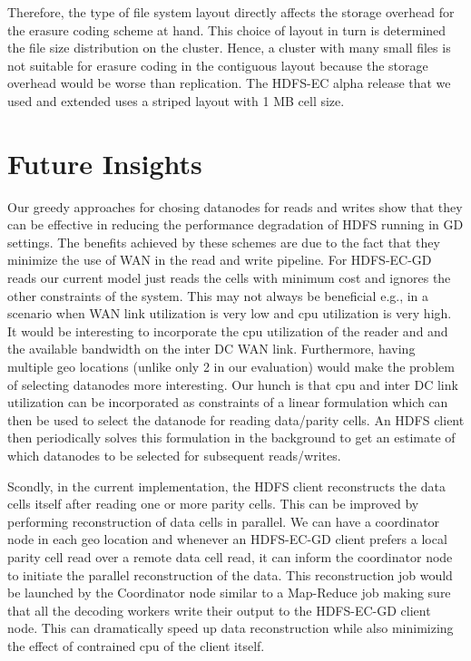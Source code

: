 \documentclass{sig-alternate-05-2015}
\begin{document}
Therefore, the type of file system layout directly affects the storage overhead for the erasure coding scheme at hand. This choice of layout in turn is determined the file size distribution on the cluster. Hence, a cluster with many small files is not suitable for erasure coding in the contiguous layout because the storage overhead would be worse than replication. The HDFS-EC alpha release that we used and extended uses a striped layout with 1 MB cell size. 

\section{Future Insights}

Our greedy approaches for chosing datanodes for reads and writes show that they can be effective in reducing the performance degradation of HDFS running in GD settings. The benefits achieved by these schemes are due to the fact that they minimize the use of WAN in the read and write pipeline. For HDFS-EC-GD reads our current model just reads the cells with minimum cost and ignores the other constraints of the system. This may not always be beneficial e.g., in a scenario when WAN link utilization is very low and cpu utilization is very high. It would be interesting to incorporate the cpu utilization of the reader and and the available bandwidth on the inter DC WAN link. Furthermore, having multiple geo locations (unlike only 2 in our evaluation) would make the problem of selecting datanodes more interesting. Our hunch is that cpu and inter DC link utilization can be incorporated as constraints of a linear formulation which can then be used to select the datanode for reading data/parity cells. An HDFS client then periodically solves this formulation in the background to get an estimate of which datanodes to be selected for subsequent reads/writes. 

Scondly, in the current implementation, the HDFS client reconstructs the data cells itself after reading one or more parity cells. This can be improved by performing reconstruction of data cells in parallel. We can have a coordinator node in each geo location and whenever an HDFS-EC-GD client prefers a local parity cell read over a remote data cell read, it can inform the coordinator node to initiate the parallel reconstruction of the data. This reconstruction job would be launched by the Coordinator node similar to a Map-Reduce job making sure that all the decoding workers write their output to the HDFS-EC-GD client node. This can dramatically speed up data reconstruction while also minimizing the effect of contrained cpu of the client itself. 
\end{document}
